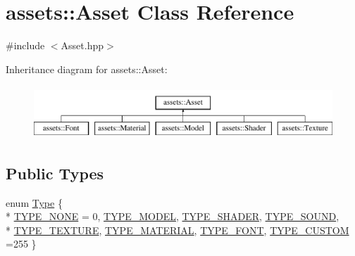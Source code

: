 \hypertarget{classassets_1_1Asset}{\section{assets\-:\-:Asset Class Reference}
\label{classassets_1_1Asset}
}


{\ttfamily \#include $<$Asset.\-hpp$>$}

Inheritance diagram for assets\-:\-:Asset\-:\begin{figure}[H]
\begin{center}
\leavevmode
\includegraphics[height=2.000000cm]{classassets_1_1Asset}
\end{center}
\end{figure}
\subsection*{Public Types}
\begin{DoxyCompactItemize}
\item 
enum \hyperlink{classassets_1_1Asset_ac3e27d6385fb4a6a961ec6425501bcf2}{Type} \{ \\*
\hyperlink{classassets_1_1Asset_ac3e27d6385fb4a6a961ec6425501bcf2a6c754bd37f1a8962208f9eece227e87f}{T\-Y\-P\-E\-\_\-\-N\-O\-N\-E} = 0, 
\hyperlink{classassets_1_1Asset_ac3e27d6385fb4a6a961ec6425501bcf2a50df1c757a446e6229b94df30891666b}{T\-Y\-P\-E\-\_\-\-M\-O\-D\-E\-L}, 
\hyperlink{classassets_1_1Asset_ac3e27d6385fb4a6a961ec6425501bcf2a32134a199c4e09cac6a7a0c5b6d63ada}{T\-Y\-P\-E\-\_\-\-S\-H\-A\-D\-E\-R}, 
\hyperlink{classassets_1_1Asset_ac3e27d6385fb4a6a961ec6425501bcf2ae3002f8a4834d4532184d18651fffa7a}{T\-Y\-P\-E\-\_\-\-S\-O\-U\-N\-D}, 
\\*
\hyperlink{classassets_1_1Asset_ac3e27d6385fb4a6a961ec6425501bcf2a4a17a0ac4a2772ca384471ceb97c4d8e}{T\-Y\-P\-E\-\_\-\-T\-E\-X\-T\-U\-R\-E}, 
\hyperlink{classassets_1_1Asset_ac3e27d6385fb4a6a961ec6425501bcf2a99a420bf63efabb0941af4b8a6e6c48c}{T\-Y\-P\-E\-\_\-\-M\-A\-T\-E\-R\-I\-A\-L}, 
\hyperlink{classassets_1_1Asset_ac3e27d6385fb4a6a961ec6425501bcf2ad56e60623d816ce033eff0a209fd28cf}{T\-Y\-P\-E\-\_\-\-F\-O\-N\-T}, 
\hyperlink{classassets_1_1Asset_ac3e27d6385fb4a6a961ec6425501bcf2a8768c613bcc647dc2aaab84b82dab3d9}{T\-Y\-P\-E\-\_\-\-C\-U\-S\-T\-O\-M} =255
 \}
\end{DoxyCompactItemize}
